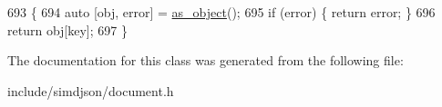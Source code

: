 \begin{DoxyCode}
693                                                                                                          \{
694   \textcolor{keyword}{auto} [obj, error] = \hyperlink{classsimdjson_1_1document_1_1element_a1fe44151506bca67f318f9f4aeb02fc6}{as\_object}();
695   \textcolor{keywordflow}{if} (error) \{ \textcolor{keywordflow}{return} error; \}
696   \textcolor{keywordflow}{return} obj[key];
697 \}
\end{DoxyCode}


The documentation for this class was generated from the following file\+:\begin{DoxyCompactItemize}
\item 
include/simdjson/document.\+h\end{DoxyCompactItemize}
